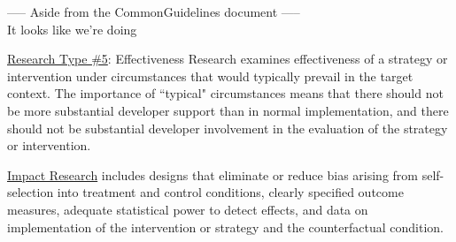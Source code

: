\documentclass[12pt]{article}
\begin{document}
\vspace{2em}
\noindent ----- Aside from the CommonGuidelines document -----\\
It looks like we're doing

\underline{Research Type \#5}: Effectiveness Research examines effectiveness of a strategy or intervention under circumstances that would typically prevail in the target context. The importance of ``typical" circumstances means that there should not be more substantial 
developer support than in normal implementation, and there should not be substantial developer involvement in the evaluation of the strategy or intervention.

\underline{Impact Research} includes designs that eliminate or reduce bias arising from self-selection into treatment and control 
conditions, clearly specified outcome measures, adequate statistical power to detect effects, and data on implementation of the intervention or strategy and the counterfactual condition.
\end{document}

